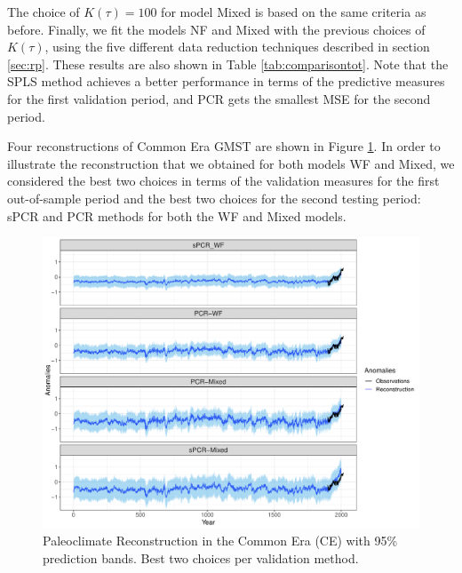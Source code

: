 \documentclass[12pt]{amsart}
\theoremstyle{plain}
\theoremstyle{definition}
\theoremstyle{remark}
\newcommand{\lb}[1]{\color{MidnightBlue}\textbf{[LB: #1]}\normalcolor}
\newcommand{\jeg}[1]{\color{ProcessBlue}\textbf{[JEG: #1]}\normalcolor}
\begin{document}
  The choice of $K(\tau)=100$ for model Mixed is
based on the same criteria as before. Finally, we fit the models NF and Mixed
with the previous choices of $K(\tau)$, using the five different data reduction
techniques described in section \ref{sec:rp}. These results are
also shown in Table \ref{tab:comparisontot}. Note that the SPLS method achieves a better performance in terms of the
predictive measures for the first validation period, and PCR gets the smallest
MSE for the second period. 

 Four reconstructions of Common Era GMST
are shown in Figure \ref{fig:paleoCE1}.
In order to illustrate the reconstruction that we obtained for both models WF and Mixed, we considered the best two choices in terms of the validation measures for the
first out-of-sample period  and the best two choices for the second testing
period: sPCR and PCR methods for both the WF and Mixed models.

\begin{figure}[h!]
  \centering
  \includegraphics[scale=0.40]{RecCE_Final}
  \caption{Paleoclimate Reconstruction in the Common Era (CE) with 95\%
    prediction bands. Best two choices per validation method.}
  \label{fig:paleoCE1}
\end{figure}

\end{document}
